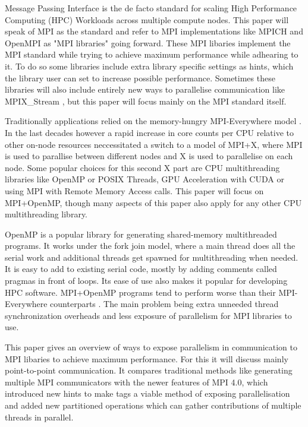 \documentclass[sigconf]{acmart}
\begin{document}
Message Passing Interface is the de facto standard for scaling High Performance Computing (HPC) Workloads across multiple compute nodes.
This paper will speak of MPI as the standard and refer to MPI implementations like MPICH and OpenMPI as "MPI libraries" going forward.
These MPI libaries implement the MPI standard while trying to achieve maximum performance while adhearing to it.
To do so some libraries include extra library specific settings as hints, which the library user can set to increase possible performance.
Sometimes these libraries will also include entirely new ways to parallelise communication like MPIX\_Stream \cite{Zhou2022}, but this paper will focus mainly on the MPI standard itself.

Traditionally applications relied on the memory-hungry MPI-Everywhere model \cite{zambreLessonsLearned2022}.
In the last decades however a rapid increase in core counts per CPU relative to other on-node resources neccessitated a switch to a model of MPI+X,
where MPI is used to parallise between different nodes and X is used to parallelise on each node.
Some popular choices for this second X part are CPU multithreading libraries like OpenMP or POSIX Threads, GPU Acceleration with CUDA or using MPI with Remote Memory Access calls.
This paper will focus on MPI+OpenMP, though many aspects of this paper also apply for any other CPU multithreading library.

OpenMP is a popular library for generating shared-memory multithreaded programs.
It works under the fork join model, where a main thread does all the serial work and additional threads get spawned for multithreading when needed.
It is easy to add to existing serial code, mostly by adding comments called pragmas in front of loops.
Its ease of use also makes it popular for developing HPC software.
MPI+OpenMP programs tend to perform worse than their MPI-Everywhere counterparts \cite{zambreLessonsLearned2022}\cite{zambreLogicalParallel2021}.
The main problem being extra unneeded thread synchronization overheads \cite{zambreLessonsLearned2022} and less exposure of parallelism for MPI libraries to use.

This paper gives an overview of ways to expose parallelism in communication to MPI libaries to achieve maximum performance.
For this it will discuss mainly point-to-point communication. It compares traditional methods like generating multiple MPI communicators with the newer features of MPI 4.0, which introduced new hints to make tags a viable method of exposing parallelisation and added new partitioned operations which can gather contributions of multiple threads in parallel.
\end{document}
